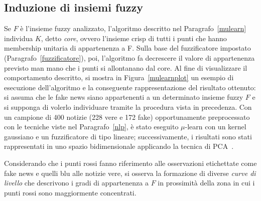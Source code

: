 \documentclass[12pt]{report}
\theoremstyle{definition}
\begin{document}
\subsection{Induzione di insiemi fuzzy}
Se $F$ è l'insieme fuzzy analizzato, l'algoritmo descritto nel Paragrafo~\ref{mulearn} individua $K$, detto \textit{core}, ovvero l'insieme crisp di tutti i punti che hanno membership unitaria di appartenenza a F. Sulla base del fuzzificatore impostato (Paragrafo~\ref{fuzzificatore}), poi, l'algoritmo fa decrescere il valore di appartenenza previsto man mano che i punti si allontanano dal core. 
Al fine di visualizzare il comportamento descritto, si mostra in Figura~\ref{mulearnplot} un esempio di esecuzione dell'algoritmo e la conseguente rappresentazione del risultato ottenuto:
si assuma che le fake news siano appartenenti a un determinato insieme fuzzy $F$ e si supponga di volerlo individuare tramite la procedura vista in precedenza.
Con un campione di 400 notizie (228 vere e 172 fake) opportunamente preprocessato con le tecniche viste nel Paragrafo~\ref{nlp}, è stato eseguito $\mu$-learn con un kernel gaussiano e un fuzzificatore di tipo lineare; successivamente, i risultati sono stati rappresentati in uno spazio bidimensionale applicando la tecnica di PCA~\cite{30}.

Considerando che i punti rossi fanno riferimento alle osservazioni etichettate come fake news e quelli blu alle notizie vere, si osserva la formazione di diverse \textit{curve di livello} che descrivono i gradi di appartenenza a $F$ in prossimità della zona in cui i punti rossi sono maggiormente concentrati.
\end{document}
